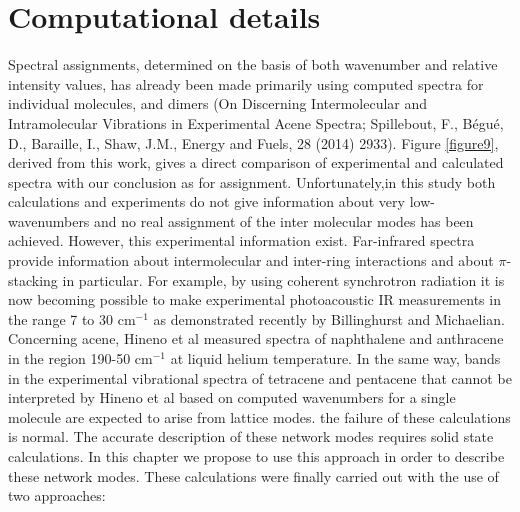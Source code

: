 \section{Computational details}


Spectral assignments, determined on the basis of both wavenumber and relative intensity values, has already been made primarily using computed spectra for individual molecules, and dimers (On Discerning Intermolecular and Intramolecular Vibrations in Experimental Acene Spectra; Spillebout, F., Bégué, D., Baraille, I., Shaw, J.M., Energy and Fuels, 28 (2014) 2933).
Figure \ref{figure9}, derived from this work, gives a direct comparison of experimental and calculated spectra with our conclusion as for assignment. Unfortunately,in this study both calculations and experiments do not give information about very low-wavenumbers and no real assignment of the inter molecular modes has been achieved. However, this experimental information exist. Far-infrared spectra provide information about intermolecular and inter-ring interactions and about $\pi$-stacking in particular. For example, by using coherent synchrotron radiation it is now becoming possible to make experimental photoacoustic IR measurements in the range 7 to 30 cm$^{-1}$ as demonstrated recently by Billinghurst and Michaelian\cite{billinghurst2010photoacoustic}. Concerning acene, Hineno et al \cite{hineno1975far}  measured spectra of naphthalene and anthracene in the region 190-50 cm$^{-1}$ at liquid helium temperature. In the same way, bands in the experimental vibrational spectra of tetracene and pentacene that cannot be interpreted by Hineno et al based on computed wavenumbers for a single molecule are expected to arise from lattice modes. the failure of these calculations is normal. The accurate description of these network modes requires solid state calculations. In this chapter we propose to use this approach in order to describe these network modes. These calculations were finally carried out with the use of two approaches:\\

